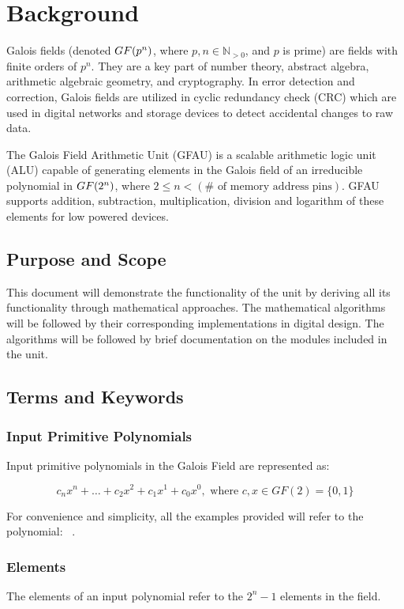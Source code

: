 \section{Background} Galois fields (denoted $GF(p^n)$, where $p,n \in
\mathbb{N}_{>0}$, and $p$ is prime) are fields with finite orders of $p^n$.
They are a key part of number theory, abstract algebra, arithmetic algebraic
geometry, and cryptography. In error detection and correction, Galois fields
are utilized in cyclic redundancy check (CRC) which are used in digital
networks and storage devices to detect accidental changes to raw data.

The Galois Field Arithmetic Unit (GFAU) is a scalable arithmetic logic unit
(ALU) capable of generating elements in the Galois field of an irreducible
polynomial in $GF(2^n)$, where $2 \leq n < (\text{$\#$ of memory address
pins})$. GFAU supports addition, subtraction, multiplication, division and
logarithm of these elements for low powered devices.

    \subsection{Purpose and Scope} This document will demonstrate the
    functionality of the unit by deriving all its functionality through
    mathematical approaches. The mathematical algorithms will be followed by
    their corresponding implementations in digital design. The algorithms will
    be followed by brief documentation on the modules included in the unit.

    \subsection{Terms and Keywords}

        \subsubsection{Input Primitive Polynomials} Input primitive
        polynomials in the Galois Field are represented as:

        \[ c_{n}x^{n}+\ldots+c_{2}x^{2}+c_{1}x^{1}+c_{0}x^{0}, \text{ where }
        c,x \in GF(2)=\{0,1\} \]

        For convenience and simplicity, all the examples provided will refer to
        the polynomial: \examplepoly~.

        \subsubsection{Elements} The elements of an input polynomial refer
        to the $2^{n}-1$ elements in the field.

